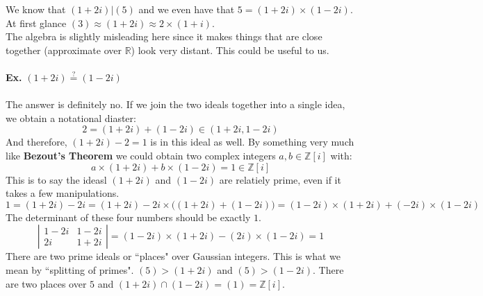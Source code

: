 \documentclass[12pt]{article}
\begin{document}
We know that $(1+2i) \big| (5)$ and we even have that $5 = (1+2i)\times(1-2i)$.  At first glance $(3) \approx (1 + 2i)\approx 2 \times (1+i)$. \\
The algebra is slightly misleading here since it makes things that are close together (approximate over $\mathbb{R}$) look very distant.  This could be useful to us. \\\\
\textbf{Ex.} $(1+2i) \stackrel{?}{=} (1-2i)$ \\ \\
The answer is definitely no.  If we join the two ideals together into a single idea, we obtain a notational diaster:
$$2 = (1+2i)+(1-2i) \in (1+2i,1-2i)$$ 
And therefore, $(1+2i) - 2 = 1$ is in this ideal as well.  By something very much like \textbf{Bezout's Theorem} we could obtain two complex integers $a,b \in \mathbb{Z}[i]$ with:
$$a \times (1+2i) + b \times (1-2i)  = 1 \in \mathbb{Z}[i]$$
This is to say the ideasl $(1+2i)$ and $(1-2i)$ are relatiely prime, even if it takes a few manipulations.  
$$ 1 = (1+2i) - 2i = (1+2i) - 2i \times \big( (1+2i)+(1-2i)\big) 
= (1-2i) \times (1+2i) + (-2i)\times (1-2i) $$
The determinant of these four numbers should be exactly $1$.
$$ \left|
\begin{array}{rc} 
1-2i & 1-2i \\
  2i & 1+2i 
\end{array}
 \right| =  
 (1-2i) \times (1+2i) - (2i)\times (1-2i) = 1 $$
There are two prime ideals or ``places" over Gaussian integers.  This is what we mean by ``splitting of primes".  $(5) > (1+2i)$ and $(5) > (1-2i)$.  There are two places over $5$ and $(1+2i) \cap (1-2i) = (1) = \mathbb{Z}[i]$. 

\newpage
\end{document}
